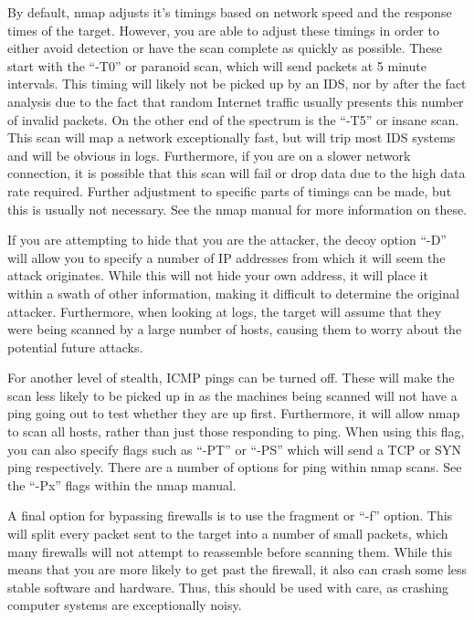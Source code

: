 \documentclass[a4paper,11pt]{report}
\begin{document}
			By default, nmap adjusts it's timings based on network speed and the response times of the target. 
			However, you are able to adjust these timings in order to either avoid detection or have the scan complete as quickly as possible. 
			These start with the ``-T0'' or paranoid scan, which will send packets at 5 minute intervals. 
			This timing will likely not be picked up by an IDS, nor by after the fact analysis due to the fact that random Internet traffic usually presents this number of invalid packets. 
			On the other end of the spectrum is the ``-T5''  or insane scan. 
			This scan will map a network exceptionally fast, but will trip most IDS systems and will be obvious in logs. 
			Furthermore, if you are on a slower network connection, it is possible that this scan will fail or drop data due to the high data rate required. 
			Further adjustment to specific parts of timings can be made, but this is usually not necessary. 
			See the nmap manual for more information on these. 

			If you are attempting to hide that you are the attacker, the decoy option ``-D'' will allow you to specify a number of IP addresses from which it will seem the attack originates.
			While this will not hide your own address, it will place it within a swath of other information, making it difficult to determine the original attacker. 
			Furthermore, when looking at logs, the target will assume that they were being scanned by a large number of hosts, causing them to worry about the potential future attacks. 

			For another level of stealth, ICMP pings can be turned off.
			These will make the scan less likely to be picked up in as the machines being scanned will not have a ping going out to test whether they are up first. 
			Furthermore, it will allow nmap to scan all hosts, rather than just those responding to ping. 
			When using this flag, you can also specify flags such as ``-PT'' or ``-PS'' which will send a TCP or SYN ping respectively. 
			There are a number of options for ping within nmap scans. See the ``-Px'' flags within the nmap manual. 

			A final option for bypassing firewalls is to use the fragment or ``-f'' option. 
			This will split every packet sent to the target into a number of small packets, which many firewalls will not attempt to reassemble before scanning them. 
			While this means that you are more likely to get past the firewall, it also can crash some less stable software and hardware. 
			Thus, this should be used with care, as crashing computer systems are exceptionally noisy. 
\end{document}
